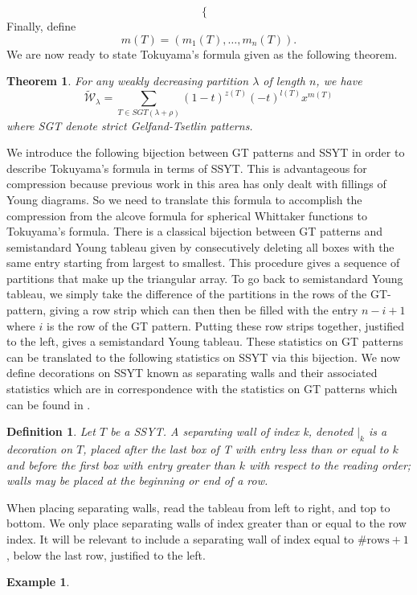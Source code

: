 \documentclass[11pt]{amsart}
\newtheorem{definition}{Definition}[section]
\newtheorem{theorem}{Theorem}[section]
\newtheorem{example}{Example}[section]
\begin{document}
{\[\begin{cases}
\end{cases}
\]
Finally, define
\[
m(T)=(m_{1}(T),\ldots, m_{n}(T)).
\]
We are now ready to state Tokuyama's formula given as the following theorem. 
\begin{theorem}\cite{G}
For any weakly decreasing partition $\lambda$ of length $n$, we have 
\[
\widetilde{\mathcal{W}}_{\lambda}=\sum_{T\in SGT(\lambda+\rho)}(1-t)^{z(T)}(-t)^{l(T)}x^{m(T)}
\]
where SGT denote strict Gelfand-Tsetlin patterns.
\end{theorem}
\indent We introduce the following bijection between GT patterns and SSYT in order to describe Tokuyama's formula in terms of SSYT. This is advantageous for compression because previous work in this area has only dealt with fillings of Young diagrams. So we need to translate this formula to accomplish the compression from the alcove formula for spherical Whittaker functions to Tokuyama's formula. 
\newline\indent There is a classical bijection between GT patterns and semistandard Young tableau given by consecutively deleting all boxes with the same entry starting from largest to smallest. This procedure gives a sequence of partitions that make up the triangular array. To go back to semistandard Young tableau, we simply take the difference of the partitions in the rows of the GT-pattern, giving a row strip which can then then be filled with the entry $n-i+1$ where $i$ is the row of the GT pattern. Putting these row strips together, justified to the left, gives a semistandard Young tableau. These statistics on GT patterns can be translated to the following statistics on SSYT via this bijection. We now define decorations on SSYT known as separating walls and their associated statistics which are in correspondence with the statistics on GT patterns which can be found in \cite[Chapter 3]{AP}.
\begin{definition}
Let $T$ be a SSYT. A \emph{separating wall of index k}, denoted $|_{k}$ is a decoration on $T$, placed after the last box of T with entry less than or equal to $k$ and before the first box with entry greater than $k$ with respect to the reading order; walls may be placed at the beginning or end of a row. 
\end{definition}
When placing separating walls, read the tableau from left to right, and top to bottom. We only place separating walls of index greater than or equal to the row index. It will be relevant to include a separating wall of index equal to $\#\textrm{rows}+1$, below the last row, justified to the left. 
\begin{example}

\end{example}}
\end{document}
